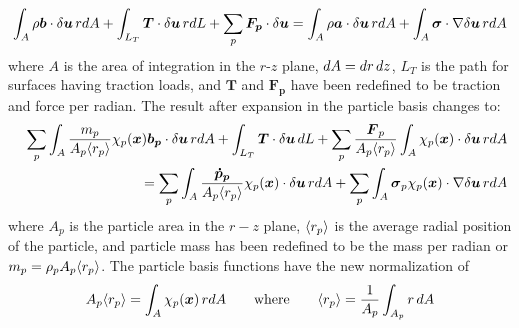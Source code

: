\documentclass[11pt]{article}
\renewcommand{\vec}[1]{\boldsymbol{#1}}
\newcommand{\tens}[1]{\boldsymbol{\mathsf{#1}}}
\begin{document}
\begin{equation}
\int_A \rho \vec b\cdot \delta\vec u \thinspace r dA + \int_{L_T} \vec T \cdot \delta\vec u \thinspace r dL + \sum_p \vec {F_p} \cdot \delta\vec u
    = \int_A  \rho \vec a\cdot \delta\vec u\thinspace r dA + \int_A  \tens\sigma \cdot \nabla \delta\vec u\thinspace r dA
\end{equation}
where $A$ is the area of integration in the $r$-$z$ plane, $dA=dr\thinspace dz$,  $L_T$ is the path for surfaces having traction loads, and  $\vec T$ and $\vec{F_p}$ have been redefined to be traction and force per radian. The result after expansion in the particle basis changes to:
\begin{eqnarray}
&&\sum_p \int_A {m_p\over A_p\avgrp} \chi_p(\vec x)\vec{b_p}\cdot \delta\vec u \thinspace r dA + \int_{L_T}\vec T \cdot \delta\vec u \thinspace dL + 
                 \sum_p  {\vec F_p\over A_p\avgrp}\int_A \chi_p(\vec x) \cdot  \delta\vec u \thinspace r dA \\
    &&\qquad\qquad
    = \sum_p\int_A {\vec{\dot p_p}\over A_p\avgrp} \chi_p(\vec x)\cdot \delta\vec u\thinspace r dA +  \sum_p\int_A \tens\sigma_p \chi_p(\vec x) \cdot \nabla \delta\vec u\thinspace r dA
\end{eqnarray}
where $A_p$ is the particle area in the $r-z$ plane, $\langle r_p\rangle$ is the average radial position of the particle, and particle mass has been redefined to be the mass per radian or $m_p = \rho_pA_p\langle r_p\rangle$. The particle basis functions have the new normalization of
\begin{equation}
   A_p\avgrp =  \int_A \chi_p(\vec x)\thinspace r dA  \qquad {\rm where} \qquad \avgrp = {1\over A_p} \int_{A_p}  r \thinspace dA
\end{equation}
\end{document}
